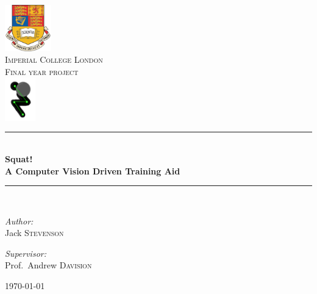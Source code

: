 \begin{titlepage}
\begin{center}

\includegraphics[width=0.15\textwidth]{title/images/ImperialCrest}~\\[1cm]

\textsc{\LARGE Imperial College London}\\[1.5cm]

\textsc{\Large Final year project}\\[0.5cm]

\includegraphics[width=0.10\textwidth]{title/images/squatslim}~\\

\noindent\rule{12cm}{0.6pt} \\
{ \huge \bfseries Squat! \\ A Computer Vision Driven Training Aid \\[0.4cm] }
\noindent\rule{12cm}{0.6pt} \\[1cm]

\begin{minipage}{0.4\textwidth}
\begin{flushleft} \large
\emph{Author:}\\
Jack \textsc{Stevenson}
\end{flushleft}
\end{minipage}
\begin{minipage}{0.4\textwidth}
\begin{flushright} \large
\emph{Supervisor:} \\
Prof.~Andrew \textsc{Davision}
\end{flushright}
\end{minipage}

\vfill

{\large \today}

\end{center}
\end{titlepage}